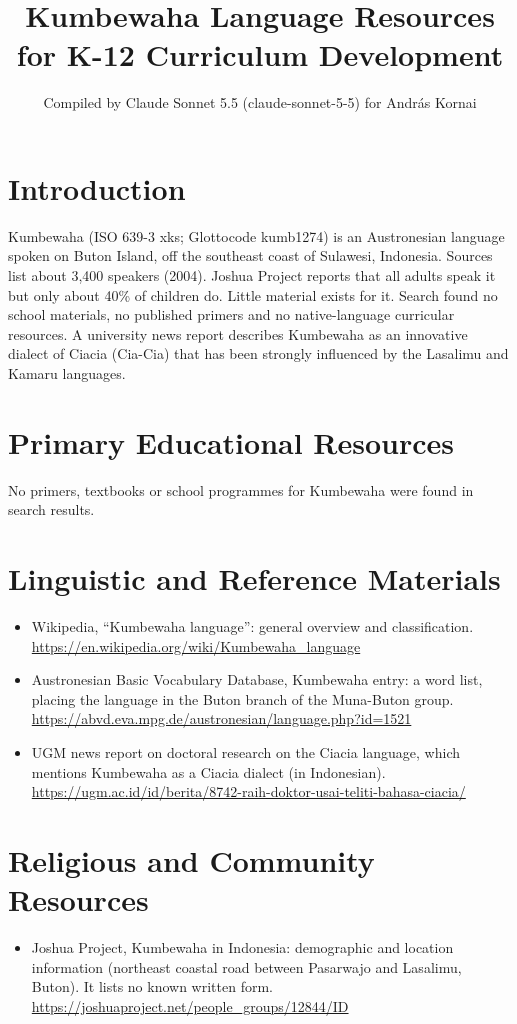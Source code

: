 \documentclass[12pt]{article}
\title{Kumbewaha Language Resources for K-12 Curriculum Development}
\author{Compiled by Claude Sonnet 5.5 (claude-sonnet-5-5) for Andr\'as Kornai}
\date{}
\begin{document}
\maketitle

\section{Introduction}
Kumbewaha (ISO 639-3 xks; Glottocode kumb1274) is an Austronesian language spoken on Buton Island, off the southeast coast of Sulawesi, Indonesia. Sources list about 3,400 speakers (2004). Joshua Project reports that all adults speak it but only about 40\% of children do. Little material exists for it. Search found no school materials, no published primers and no native-language curricular resources. A university news report describes Kumbewaha as an innovative dialect of Ciacia (Cia-Cia) that has been strongly influenced by the Lasalimu and Kamaru languages.

\section{Primary Educational Resources}
No primers, textbooks or school programmes for Kumbewaha were found in search results.

\section{Linguistic and Reference Materials}
\begin{itemize}
\item Wikipedia, ``Kumbewaha language'': general overview and classification. \url{https://en.wikipedia.org/wiki/Kumbewaha_language}
\item Austronesian Basic Vocabulary Database, Kumbewaha entry: a word list, placing the language in the Buton branch of the Muna-Buton group. \url{https://abvd.eva.mpg.de/austronesian/language.php?id=1521}
\item UGM news report on doctoral research on the Ciacia language, which mentions Kumbewaha as a Ciacia dialect (in Indonesian). \url{https://ugm.ac.id/id/berita/8742-raih-doktor-usai-teliti-bahasa-ciacia/}
\end{itemize}

\section{Religious and Community Resources}
\begin{itemize}
\item Joshua Project, Kumbewaha in Indonesia: demographic and location information (northeast coastal road between Pasarwajo and Lasalimu, Buton). It lists no known written form. \url{https://joshuaproject.net/people_groups/12844/ID}
\end{itemize}
\end{document}

